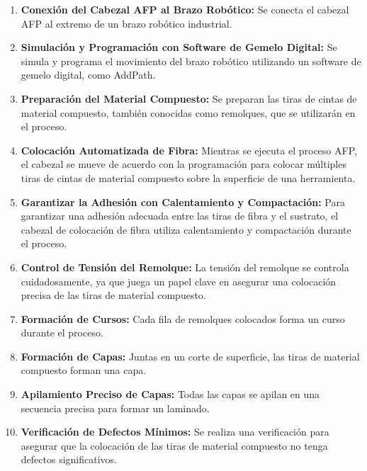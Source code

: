 \begin{enumerate}[label=\arabic*.]

    \item \textbf{Conexión del Cabezal AFP al Brazo Robótico:}
        Se conecta el cabezal AFP al extremo de un brazo robótico industrial.
        
    \item \textbf{Simulación y Programación con Software de Gemelo Digital:}
        Se simula y programa el movimiento del brazo robótico utilizando un software de gemelo digital, como AddPath.

    \item \textbf{Preparación del Material Compuesto:}
        Se preparan las tiras de cintas de material compuesto, también conocidas como remolques, que se utilizarán en el proceso.

    \item \textbf{Colocación Automatizada de Fibra:}
        Mientras se ejecuta el proceso AFP, el cabezal se mueve de acuerdo con la programación para colocar múltiples tiras de cintas de material compuesto sobre la superficie de una herramienta.

    \item \textbf{Garantizar la Adhesión con Calentamiento y Compactación:}
        Para garantizar una adhesión adecuada entre las tiras de fibra y el sustrato, el cabezal de colocación de fibra utiliza calentamiento y compactación durante el proceso.

    \item \textbf{Control de Tensión del Remolque:}
        La tensión del remolque se controla cuidadosamente, ya que juega un papel clave en asegurar una colocación precisa de las tiras de material compuesto.

    \item \textbf{Formación de Cursos:}
        Cada fila de remolques colocados forma un curso durante el proceso.

    \item \textbf{Formación de Capas:}
        Juntas en un corte de superficie, las tiras de material compuesto forman una capa.

    \item \textbf{Apilamiento Preciso de Capas:}
        Todas las capas se apilan en una secuencia precisa para formar un laminado.

    \item \textbf{Verificación de Defectos Mínimos:}
        Se realiza una verificación para asegurar que la colocación de las tiras de material compuesto no tenga defectos significativos.


\end{enumerate}
